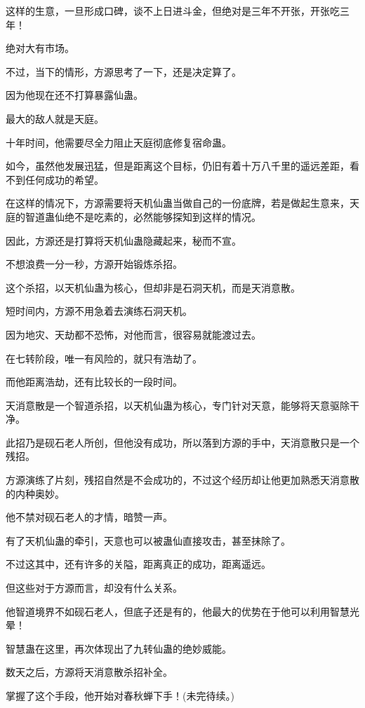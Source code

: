 \begin{this_body}
这样的生意，一旦形成口碑，谈不上日进斗金，但绝对是三年不开张，开张吃三年！

绝对大有市场。

不过，当下的情形，方源思考了一下，还是决定算了。

因为他现在还不打算暴露仙蛊。

最大的敌人就是天庭。

十年时间，他需要尽全力阻止天庭彻底修复宿命蛊。

如今，虽然他发展迅猛，但是距离这个目标，仍旧有着十万八千里的遥远差距，看不到任何成功的希望。

在这样的情况下，方源需要将天机仙蛊当做自己的一份底牌，若是做起生意来，天庭的智道蛊仙绝不是吃素的，必然能够探知到这样的情况。

因此，方源还是打算将天机仙蛊隐藏起来，秘而不宣。

不想浪费一分一秒，方源开始锻炼杀招。

这个杀招，以天机仙蛊为核心，但却非是石洞天机，而是天消意散。

短时间内，方源不用急着去演练石洞天机。

因为地灾、天劫都不恐怖，对他而言，很容易就能渡过去。

在七转阶段，唯一有风险的，就只有浩劫了。

而他距离浩劫，还有比较长的一段时间。

天消意散是一个智道杀招，以天机仙蛊为核心，专门针对天意，能够将天意驱除干净。

此招乃是砚石老人所创，但他没有成功，所以落到方源的手中，天消意散只是一个残招。

方源演练了片刻，残招自然是不会成功的，不过这个经历却让他更加熟悉天消意散的内种奥妙。

他不禁对砚石老人的才情，暗赞一声。

有了天机仙蛊的牵引，天意也可以被蛊仙直接攻击，甚至抹除了。

不过这其中，还有许多的关隘，距离真正的成功，距离遥远。

但这些对于方源而言，却没有什么关系。

他智道境界不如砚石老人，但底子还是有的，他最大的优势在于他可以利用智慧光晕！

智慧蛊在这里，再次体现出了九转仙蛊的绝妙威能。

数天之后，方源将天消意散杀招补全。

掌握了这个手段，他开始对春秋蝉下手！(未完待续。)

\end{this_body}

